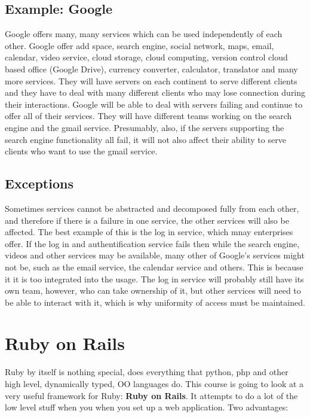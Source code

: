 \documentclass[11pt]{article}
\begin{document}
\subsection{Example: Google}

Google offers many, many services which can be used independently of each other. Google offer add space, search engine, social network, maps, email, calendar, video service, cloud storage, cloud computing, version control cloud based office (Google Drive), currency converter, calculator, translator and many more services. They will have servers on each continent to serve different clients and they have to deal with many different clients who may lose connection during their interactions. Google will be able to deal with servers failing and continue to offer all of their services. They will have different teams working on the search engine and the gmail service. Presumably, also, if the servers supporting the search engine functionality all fail, it will not also affect their ability to serve clients who want to use the gmail service.

\subsection{Exceptions}

Sometimes services cannot be abstracted and decomposed fully from each other, and therefore if there is a failure in one service, the other services will also be affected. The best example of this is the log in service, which mnay enterprises offer. If the log in and authentification service fails then while the search engine, videos and other services may be available, many other of Google's services might not be, such as the email service, the calendar service and others. This is because it it is too integrated into the usage. The log in service will probably still have its own team, however, who can take ownership of it, but other services will need to be able to interact with it, which is why uniformity of access must be maintained.


\section{Ruby on Rails}

Ruby by itself is nothing special, does everything that python, php and other high level, dynamically typed, OO languages do. This course is going to look at a very useful framework for Ruby: \textbf{Ruby on Rails}. It attempts to do a lot of the low level stuff when you when you set up a web application. Two advantages:
\end{document}
